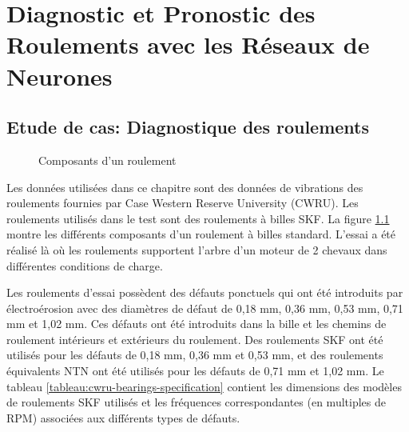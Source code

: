 \chapter{Diagnostic et Pronostic des Roulements avec les Réseaux de Neurones}


\section{Etude de cas: Diagnostique des roulements}%
\label{sec:etude_de_cas_diagnostique_des_roulements}

\begin{figure}
    \centering
	
	\caption{Composants d'un roulement}
    \label{figure:skf-bearing-components}    
\end{figure}

Les données utilisées dans ce chapitre sont des données de vibrations des roulements fournies par Case Western Reserve University (CWRU). Les roulements utilisés dans le test sont des roulements à billes SKF. La figure \ref{figure:skf-bearing-components} montre les différents composants d'un roulement à billes standard. L'essai a été réalisé là où les roulements supportent l'arbre d'un moteur de 2 chevaux dans différentes conditions de charge. 

Les roulements d'essai possèdent des défauts ponctuels qui ont été introduits par électroérosion avec des diamètres de défaut de 0,18 mm, 0,36 mm, 0,53 mm, 0,71 mm et 1,02 mm. Ces défauts ont été introduits dans la bille et les chemins de roulement intérieurs et extérieurs du roulement. Des roulements SKF ont été utilisés pour les défauts de 0,18 mm, 0,36 mm et 0,53 mm, et des roulements équivalents NTN ont été utilisés pour les défauts de 0,71 mm et 1,02 mm. Le tableau \ref{tableau:cwru-bearings-specification} contient les dimensions des modèles de roulements SKF utilisés et les fréquences correspondantes (en multiples de RPM) associées aux différents types de défauts.

